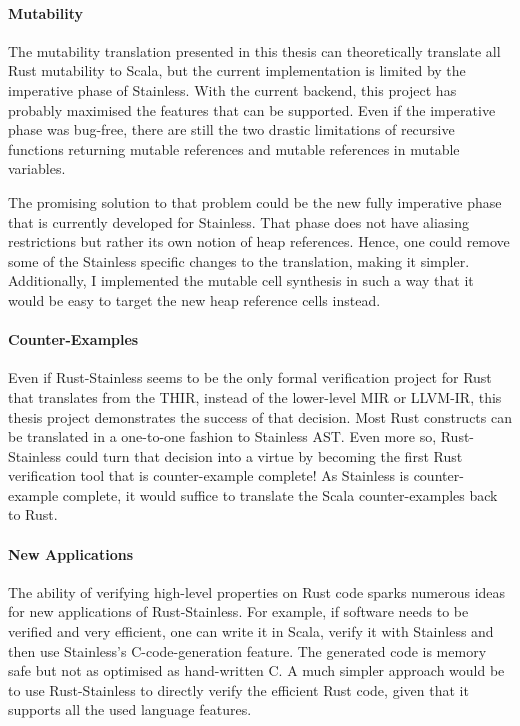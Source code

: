 \paragraph{Mutability}

The mutability translation presented in this thesis can theoretically translate
all Rust mutability to Scala, but the current implementation is limited by the
imperative phase of Stainless. With the current backend, this project has
probably maximised the features that can be supported. Even if the imperative
phase was bug-free, there are still the two drastic limitations of recursive
functions returning mutable references and mutable references in mutable
variables.

The promising solution to that problem could be the new fully imperative phase
that is currently developed for Stainless. That phase does not have aliasing
restrictions but rather its own notion of heap references. Hence, one could
remove some of the Stainless specific changes to the translation, making it
simpler. Additionally, I implemented the mutable cell synthesis in such a way
that it would be easy to target the new heap reference cells instead.


\paragraph{Counter-Examples}

Even if Rust-Stainless seems to be the only formal verification project for Rust
that translates from the THIR, instead of the lower-level MIR or LLVM-IR, this
thesis project demonstrates the success of that decision. Most Rust constructs can be
translated in a one-to-one fashion to Stainless AST. Even more so,
Rust-Stainless could turn  that decision into a virtue by becoming the first
Rust verification tool that is counter-example complete! As Stainless is
counter-example complete, it would suffice to translate the Scala
counter-examples back to Rust.


\paragraph{New Applications}

The ability of verifying high-level properties on Rust code sparks numerous
ideas for new applications of Rust-Stainless. For example, if software needs to
be verified and very efficient, one can write it in Scala, verify it with
Stainless and then use Stainless's C-code-generation feature. The generated code
is memory safe but not as optimised as hand-written C. A much simpler approach
would be to use Rust-Stainless  to directly verify the efficient Rust code,
given that it supports all the used language features.

